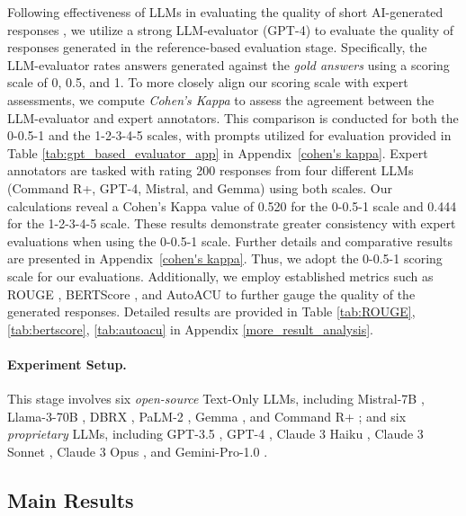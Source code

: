Following effectiveness of LLMs in evaluating the quality of short AI-generated responses \cite{wang2023evaluating, lu2024mathvista, alpacafarm, charxiv}, we utilize a strong LLM-evaluator (GPT-4) to evaluate the quality of responses generated in the reference-based evaluation stage.
%
Specifically, the LLM-evaluator rates answers generated against the \emph{gold answers} using a scoring scale of 0, 0.5, and 1.
%
To more closely align our scoring scale with expert assessments, we compute \emph{Cohen's Kappa} \cite{cohen's_kappa} to assess the agreement between the LLM-evaluator and expert annotators. 
%
This comparison is conducted for both the 0-0.5-1 and the 1-2-3-4-5 scales, with prompts utilized for evaluation provided in Table \ref{tab:gpt_based_evaluator_app} in Appendix~\ref{cohen's kappa}. 
%
Expert annotators are tasked with rating 200 responses from four different LLMs (Command R+, GPT-4, Mistral, and Gemma) using both scales. 
%
Our calculations reveal a Cohen's Kappa value of 0.520 for the 0-0.5-1 scale and 0.444 for the 1-2-3-4-5 scale. 
%
These results demonstrate greater consistency with expert evaluations when using the 0-0.5-1 scale. 
%
Further details and comparative results are presented in Appendix~\ref{cohen's kappa}.
%
Thus, we adopt the 0-0.5-1 scoring scale for our evaluations.
%
Additionally, we employ established metrics such as ROUGE \cite{lin-2004-rouge}, BERTScore \cite{zhang2020bertscore}, and AutoACU \cite{autoacu} to further gauge the quality of the generated responses.
Detailed results are provided in Table \ref{tab:ROUGE}, \ref{tab:bertscore}, \ref{tab:autoacu} in Appendix \ref{more_result_analysis}.


\paragraph{Experiment Setup.}

This stage involves six \emph{open-source} Text-Only LLMs, including
Mistral-7B \cite{jiang2023mistral}, 
Llama-3-70B \cite{llama3}, 
DBRX \cite{DBRX}, 
PaLM-2 \citep{palm2},
Gemma \citep{gemma},
and Command R+ \cite{commandR+};
and six \emph{proprietary} LLMs, including 
GPT-3.5 \citep{gpt3.5}, 
GPT-4 \cite{openai2024gpt4}, 
Claude 3 Haiku \citep{claude3}, 
Claude 3 Sonnet \citep{claude3}, 
Claude 3 Opus \cite{claude3}, 
and Gemini-Pro-1.0 \cite{geminiteam2023gemini}.




\subsection{Main Results}

